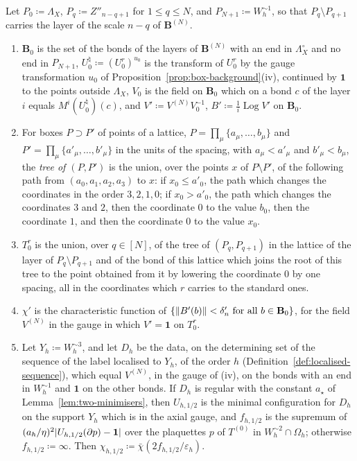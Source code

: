 \documentclass[11pt]{preprint}
\newcommand{\id}{\mathbf 1}
\DeclarePairedDelimiter{\abs}{\lvert}{\rvert}
\DeclarePairedDelimiter{\norm}{\lVert}{\rVert}
\numberwithin{equation}{section}
\begin{document}
\begin{definition}\label{def:box-fluctuation}
Let $P_0 \coloneqq \Lambda_X$, $P_q \coloneqq Z''_{n-q+1}$ for $1 \leqslant q \leqslant N$, and $P_{N+1} \coloneqq W_h^{\sim1}$, so that $P_q \setminus P_{q+1}$ carries the layer of the scale $n - q$ of $\mathbf B^{(N)}$.
\begin{enumerate}[label=(\roman*)]
\item $\mathbf B_0$ is the set of the bonds of the layers of $\mathbf B^{(N)}$ with an end in $\Lambda^\circ_X$ and no end in $P_{N+1}$, $U^\natural_0 \coloneqq (U^r_0)^{u_0}$ is the transform of $U^r_0$ by the gauge transformation $u_0$ of Proposition~\ref{prop:box-background}(iv), continued by $\id$ to the points outside $\Lambda_X$, $V_0$ is the field on $\mathbf B_0$ which on a bond $c$ of the layer $i$ equals $M^i(U^\natural_0)(c)$, and $V' \coloneqq V^{(N)}V_0^{-1}$, $B' \coloneqq \frac{1}{i}\operatorname{Log}V'$ on $\mathbf B_0$.
\item For boxes $P \supset P'$ of points of a lattice, $P = \prod_\mu\{ a_\mu, \dots, b_\mu \}$ and $P' = \prod_\mu\{ a'_\mu, \dots, b'_\mu \}$ in the units of the spacing, with $a_\mu < a'_\mu$ and $b'_\mu < b_\mu$, the \emph{tree of $(P, P')$} is the union, over the points $x$ of $P \setminus P'$, of the following path from $(a_0, a_1, a_2, a_3)$ to $x$: if $x_0 \leqslant a'_0$, the path which changes the coordinates in the order $3, 2, 1, 0$; if $x_0 > a'_0$, the path which changes the coordinates $3$ and $2$, then the coordinate $0$ to the value $b_0$, then the coordinate $1$, and then the coordinate $0$ to the value $x_0$.
\item $T^r_0$ is the union, over $q \in [N]$, of the tree of $(P_q, P_{q+1})$ in the lattice of the layer of $P_q \setminus P_{q+1}$ and of the bond of this lattice which joins the root of this tree to the point obtained from it by lowering the coordinate $0$ by one spacing, all in the coordinates which $r$ carries to the standard ones.
\item $\chi'$ is the characteristic function of $\{ \norm{B'(b)} < \delta'_n \text{ for all } b \in \mathbf B_0 \}$, for the field $V^{(N)}$ in the gauge in which $V' = \id$ on $T^r_0$.
\item Let $Y_h \coloneqq W_h^{\sim3}$, and let $D_h$ be the data, on the determining set of the sequence of the label localised to $Y_h$, of the order $h$ (Definition~\ref{def:localised-sequence}), which equal $V^{(N)}$, in the gauge of (iv), on the bonds with an end in $W_h^{\sim1}$ and $\id$ on the other bonds. If $D_h$ is regular with the constant $a_\star$ of Lemma~\ref{lem:two-minimisers}, then $U_{h,1/2}$ is the minimal configuration for $D_h$ on the support $Y_h$ which is in the axial gauge, and $f_{h,1/2}$ is the supremum of $(a_h/\eta)^2\abs{U_{h,1/2}(\partial p) - \id}$ over the plaquettes $p$ of $T^{(0)}$ in $W_h^{\sim2} \cap \Omega_h$; otherwise $f_{h,1/2} \coloneqq \infty$. Then $\chi_{h,1/2} \coloneqq \bar\chi(2f_{h,1/2}/\varepsilon_h)$.
\end{enumerate}
\end{definition}
\end{document}
